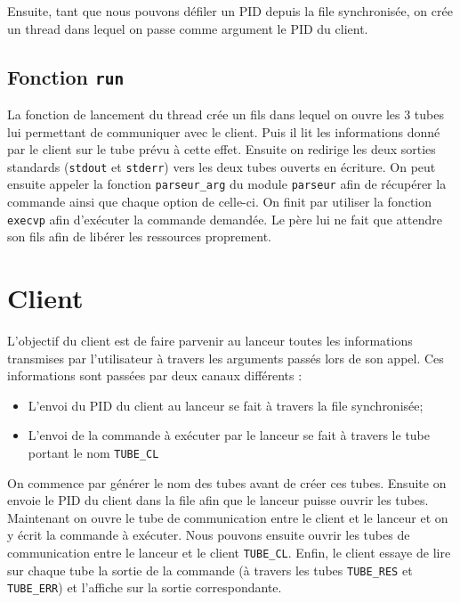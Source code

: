 \documentclass[12pt]{article}
\begin{document}
    Ensuite, tant que nous pouvons défiler un PID depuis la file synchronisée, on crée un thread dans lequel on passe comme argument le PID du client.

    \subsection{Fonction \texttt{run}}
    La fonction de lancement du thread crée un fils dans lequel on ouvre les 3
    tubes lui permettant de communiquer avec le client. Puis il lit les informations donné par le client sur le tube prévu à cette effet. Ensuite on redirige les deux sorties standards (\texttt{stdout} et \texttt{stderr}) vers les deux tubes ouverts en écriture. On peut ensuite appeler la fonction \texttt{parseur\_arg} du module \texttt{parseur} afin de récupérer la commande ainsi que chaque option de celle-ci. On finit par utiliser la fonction \texttt{execvp} afin d'exécuter la commande demandée. Le père lui ne fait que attendre son fils afin
    de libérer les ressources proprement.


    \section{Client}
    L'objectif du client est de faire parvenir au lanceur toutes les informations transmises par l'utilisateur à travers les arguments passés lors de son appel. Ces informations sont passées par deux canaux différents :
    \begin{itemize}
        \item L'envoi du PID du client au lanceur se fait à travers la file synchronisée;
        \item L'envoi de la commande à exécuter par le lanceur se fait à travers le tube portant le nom \texttt{TUBE\_CL}
    \end{itemize}
    On commence par générer le nom des tubes avant de créer ces tubes. Ensuite on
    envoie le PID du client dans la file afin que le lanceur puisse ouvrir les tubes.
    Maintenant on ouvre le tube de communication entre le client et le lanceur
    et on y écrit la commande à exécuter.
    Nous pouvons ensuite ouvrir les tubes de communication entre le lanceur et le client \texttt{TUBE\_CL}. Enfin, le client essaye de lire sur chaque tube la sortie de la commande (à travers les tubes \texttt{TUBE\_RES} et \texttt{TUBE\_ERR}) et l'affiche sur la sortie correspondante.
\end{document}
